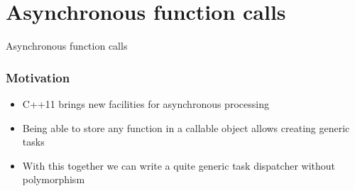 \documentclass{beamer}
\begin{document}
\section{Asynchronous function calls}


\begin{frame}
    \begin{center}
        Asynchronous function calls
    \end{center}
\end{frame}

\begin{frame}
\frametitle{Motivation}
    \begin{itemize}
        \item C++11 brings new facilities for asynchronous processing
        \pause
        \item Being able to store any function in a callable object allows creating generic tasks
        \item With this together we can write a quite generic task dispatcher without polymorphism
    \end{itemize}
\end{frame}
\end{document}
